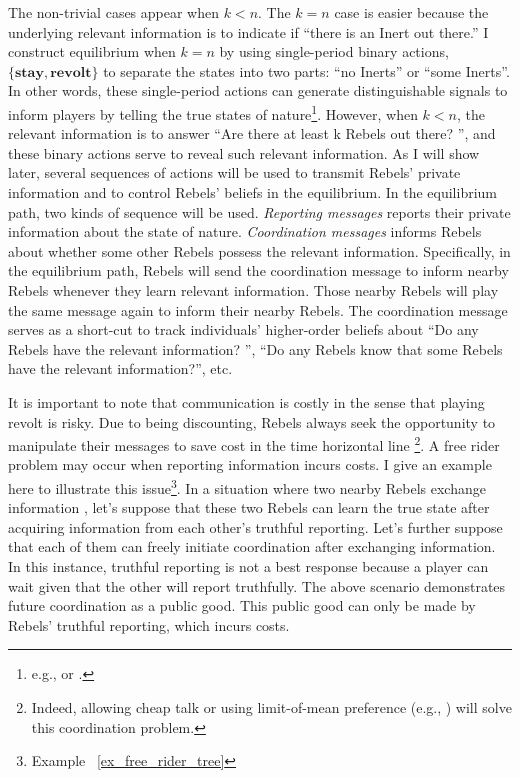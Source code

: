 \documentclass[12pt,letterpaper]{article}
\newtheorem*{main result}{Main Result}
\theoremstyle{definition}
\theoremstyle{remark}
\theoremstyle{claim}
\begin{document}
The non-trivial cases appear when $k<n$. The $k=n$ case is easier because the underlying relevant information is to indicate if ``there is an Inert out there.'' I construct equilibrium when $k=n$ by using single-period binary actions, $\{\textbf{stay},\textbf{revolt}\}$ to separate the states into two parts: ``no Inerts'' or ``some Inerts''. In other words, these single-period actions can generate distinguishable signals to inform players by telling the true states of nature\footnote{e.g., \citep{Fudenberg2010} or \citep{Fudenberg2011}.}. However, when $k<n$, the relevant information is to answer ``Are there at least k Rebels out there? '', and these binary actions serve to reveal such relevant information. As I will show later, several sequences of actions will be used to transmit Rebels' private information and to control Rebels' beliefs in the equilibrium. In the equilibrium path, two kinds of sequence will be used. \textit{Reporting messages} reports their private information about the state of nature. \textit{Coordination messages} informs Rebels about whether some other Rebels possess the relevant information. Specifically, in the equilibrium path, Rebels will send the coordination message to inform nearby Rebels whenever they learn relevant information. Those nearby Rebels will play the same message again to inform their nearby Rebels. The coordination message serves as a short-cut to track individuals' higher-order beliefs about ``Do any Rebels have the relevant information? '', ``Do any Rebels know that some Rebels have the relevant information?'', etc.



It is important to note that communication is costly in the sense that playing revolt is risky. Due to being discounting, Rebels always seek the opportunity to manipulate their messages to save cost in the time horizontal line \footnote{Indeed, allowing cheap talk or using limit-of-mean preference (e.g., \citep{Renault1998}) will solve this coordination problem.}. A free rider problem may occur when reporting information incurs costs. I give an example here to illustrate this issue\footnote{Example ~\ref{ex_free_rider_tree}}. In a situation where two nearby Rebels exchange information  , let's suppose that these two Rebels can learn the true state after acquiring information from each other's truthful reporting. Let's further suppose that each of them can freely initiate coordination after exchanging information. In this instance, truthful reporting is not a best response because a player can wait given that the other will report truthfully. The above scenario demonstrates future coordination as a public good. This public good can only be made by Rebels' truthful reporting, which incurs costs.
\end{document}
